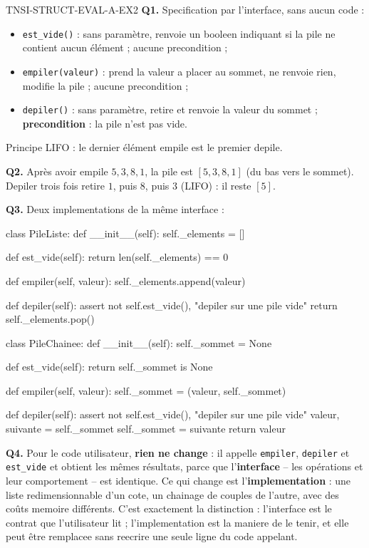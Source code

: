 \begin{corrige}{TNSI-STRUCT-EVAL-A-EX2}
\textbf{Q1.} Specification par l'interface, sans aucun code :
\begin{itemize}
  \item \lstinline{est_vide()} : sans paramètre, renvoie un booleen indiquant si la pile ne
  contient aucun élément ; aucune precondition ;
  \item \lstinline{empiler(valeur)} : prend la valeur a placer au sommet, ne renvoie rien,
  modifie la pile ; aucune precondition ;
  \item \lstinline{depiler()} : sans paramètre, retire et renvoie la valeur du sommet ;
  \textbf{precondition} : la pile n'est pas vide.
\end{itemize}
Principe LIFO : le dernier élément empile est le premier depile.

\textbf{Q2.} Après avoir empile $5,3,8,1$, la pile est $[5,3,8,1]$ (du bas vers le sommet). Depiler trois fois retire $1$, puis $8$, puis $3$ (LIFO) : il reste $[5]$.

\textbf{Q3.} Deux implementations de la même interface :

\begin{python}
class PileListe:
    def __init__(self):
        self._elements = []

    def est_vide(self):
        return len(self._elements) == 0

    def empiler(self, valeur):
        self._elements.append(valeur)

    def depiler(self):
        assert not self.est_vide(), "depiler sur une pile vide"
        return self._elements.pop()


class PileChainee:
    def __init__(self):
        self._sommet = None

    def est_vide(self):
        return self._sommet is None

    def empiler(self, valeur):
        self._sommet = (valeur, self._sommet)

    def depiler(self):
        assert not self.est_vide(), "depiler sur une pile vide"
        valeur, suivante = self._sommet
        self._sommet = suivante
        return valeur
\end{python}

\textbf{Q4.} Pour le code utilisateur, \textbf{rien ne change} : il appelle
\lstinline{empiler}, \lstinline{depiler} et \lstinline{est_vide} et obtient les mêmes
résultats, parce que l'\textbf{interface} -- les opérations et leur comportement -- est
identique. Ce qui change est l'\textbf{implementation} : une liste redimensionnable d'un
cote, un chainage de couples de l'autre, avec des coûts memoire différents. C'est
exactement la distinction : l'interface est le contrat que l'utilisateur lit ;
l'implementation est la maniere de le tenir, et elle peut être remplacee sans reecrire une
seule ligne du code appelant.
\end{corrige}
